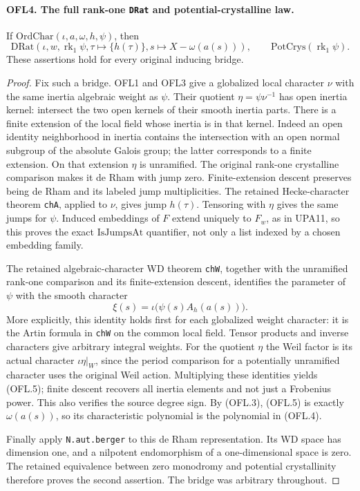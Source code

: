 \paragraph{OFL4. The full rank-one \texttt{DRat} and potential-crystalline law.}
\label{claim:OFL4}
If \(\mathrm{OrdChar}(\iota,a,\omega,h,\psi)\), then
\[
 \mathrm{DRat}\!\left(\iota,w,\operatorname{rk}_1\psi,
                 \tau\mapsto\{h(\tau)\},
                 s\mapsto X-\omega(a(s))\right),
 \qquad \mathrm{PotCrys}(\operatorname{rk}_1\psi).
 \tag{OFL.4}
\]
These assertions hold for every original inducing bridge.
\begin{proof}
Fix such a bridge.  OFL1 and OFL3 give a globalized local character
\(\nu\) with the same inertia algebraic weight as \(\psi\).
Their quotient \(\eta=\psi\nu^{-1}\) has open inertia kernel:
intersect the two open kernels of their smooth inertia parts.
There is a finite extension of the local field whose inertia is
in that kernel.  Indeed an open identity neighborhood in inertia
contains the intersection with an open normal subgroup of the
absolute Galois group; the latter corresponds to a finite extension.
On that extension \(\eta\) is unramified.  The original
rank-one crystalline comparison makes it de Rham with jump zero.
Finite-extension descent preserves being de Rham and its labeled
jump multiplicities.  The retained Hecke-character theorem
\texttt{chA}, applied to \(\nu\), gives jump \(h(\tau)\).
Tensoring with \(\eta\) gives the same jumps for \(\psi\).
Induced embeddings of \(F\) extend uniquely to \(F_w\), as
in UPA11, so this proves the exact \(\mathrm{IsJumpsAt}\)
quantifier, not only a list indexed by a chosen embedding family.

The retained algebraic-character WD theorem \texttt{chW}, together
with the unramified rank-one comparison and its finite-extension
descent, identifies the parameter of \(\psi\) with the smooth
character
\[
 \xi(s)=\iota\bigl(\psi(s)A_h(a(s))\bigr).
 \tag{OFL.5}
\]
More explicitly, this identity holds first for each globalized
weight character: it is the Artin formula in \texttt{chW} on
the common local field.  Tensor products and inverse characters
give arbitrary integral weights.  For the quotient \(\eta\)
the Weil factor is its actual character \(\iota\eta|_W\),
since the period comparison for a potentially unramified character
uses the original Weil action.  Multiplying these identities yields
(OFL.5); finite descent recovers all inertia elements and not just
a Frobenius power.  This also verifies the source degree sign.
By (OFL.3), (OFL.5) is exactly \(\omega(a(s))\), so its
characteristic polynomial is the polynomial in (OFL.4).

Finally apply \texttt{N.aut.berger} to this de Rham representation.
Its WD space has dimension one, and a nilpotent endomorphism of a
one-dimensional space is zero.  The retained equivalence between
zero monodromy and potential crystallinity therefore proves the
second assertion.  The bridge was arbitrary throughout.
\end{proof}

